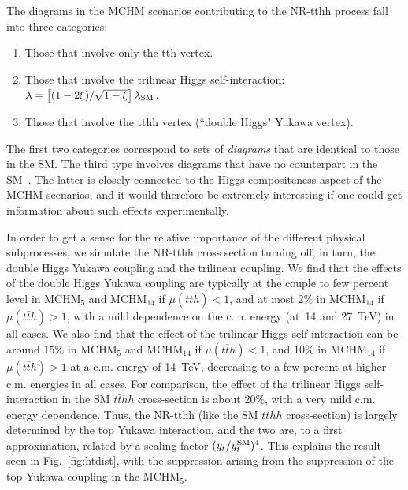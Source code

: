 \label{NRtth}
The diagrams in the MCHM scenarios contributing to the NR-tthh process
fall into three categories:
%
\begin{enumerate}
\item Those that involve only the tth vertex.
\item Those that involve the trilinear Higgs self-interaction:
$\lambda = \left[ (1 - 2 \xi)/\sqrt{1 - \xi} \right] \lambda_{\rm
SM}$.
\item Those that involve the tthh vertex (``double Higgs" Yukawa vertex).
\end{enumerate}
%
The first two categories correspond to sets of \textit{diagrams} that
are identical to those in the SM. The third type involves diagrams
that have no counterpart in the SM~\cite{Contino:2012xk}.  The latter
is closely connected to the Higgs compositeness aspect of the MCHM
scenarios, and it would therefore be extremely interesting if one
could get information about such effects experimentally.

In order to get a sense for the relative importance of the different
physical subprocesses, we simulate the NR-tthh cross section
turning off, in turn, the double Higgs Yukawa coupling and the trilinear
coupling.  We find that the effects of the double Higgs Yukawa coupling are
typically at the couple to few percent level in MCHM$_5$ and MCHM$_{14}$ if $\mu(t\bar{t}h) < 1$, and at most $2\%$ in MCHM$_{14}$ if $\mu(t\bar{t}h) > 1$, with a mild dependence
on the c.m. energy (at~14 and 27~TeV) in all cases.
We also find that the effect of the trilinear Higgs self-interaction
can be around $15\%$ in MCHM$_5$ and MCHM$_{14}$ if $\mu(t\bar{t}h) < 1$, and $10\%$ in MCHM$_{14}$ if $\mu(t\bar{t}h) > 1$ at a c.m. energy of 14~TeV, decreasing to a few
percent at higher c.m. energies in all cases.  For comparison, the effect of the
trilinear Higgs self-interaction in the SM $t\bar{t}hh$ cross-section
is about $20\%$, with a very mild c.m. energy dependence.  Thus, the
NR-tthh (like the SM $t\bar{t}hh$ cross-section) is largely determined
by the top Yukawa interaction, and the two are, to a first
approximation, related by a scaling factor $(y_t / y_t^ {\rm SM})^4$.
This explains the result seen in Fig.~\ref{fig:htdist}, with the
suppression arising from the suppression of the top Yukawa coupling in
the MCHM$_5$.


